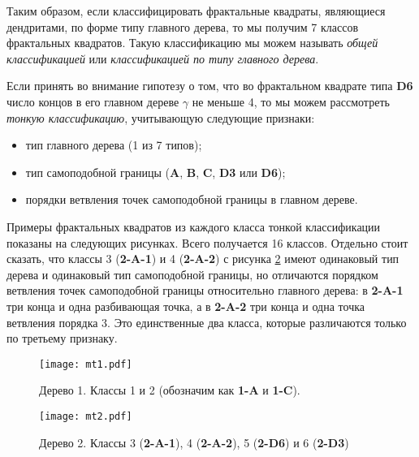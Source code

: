 Таким образом, если классифицировать фрактальные квадраты, являющиеся дендритами, по форме типу главного дерева, то мы получим 7 классов фрактальных квадратов.
Такую классификацию мы можем называть {\em общей классификацией} или {\em классификацией по типу главного дерева}.

Если принять во внимание гипотезу о том, что во фрактальном квадрате типа {\bf D6} число концов в его главном дереве $\gamma$ не меньше 4, то мы можем рассмотреть {\em тонкую классификацию}, учитывающую следующие признаки:
\begin{itemize}[nolistsep]
	\item[1.] тип главного дерева (1 из 7 типов);
	\item[2.] тип самоподобной границы ({\bf A}, {\bf B}, {\bf C}, {\bf D3} или {\bf D6});
	\item[3.] порядки ветвления точек самоподобной границы в главном дереве.
\end{itemize}

Примеры фрактальных квадратов из каждого класса тонкой классификации показаны на следующих рисунках.
Всего получается 16 классов.
Отдельно стоит сказать, что классы 3 ({\bf 2-A-1}) и 4 ({\bf 2-A-2}) с рисунка \ref{fig:tree2} имеют одинаковый тип дерева и одинаковый тип самоподобной границы, но отличаются порядком ветвления точек самоподобной границы относительно главного дерева: в {\bf 2-A-1} три конца и одна разбивающая точка, а в {\bf 2-A-2} три конца и одна точка ветвления порядка 3.
Это единственные два класса, которые различаются только по третьему признаку.


\begin{figure}[H]
    \centering
    \texttt{[image: mt1.pdf]}
    \vspace{0.5cm}
    \vfill
    \hfill
    \caption{Дерево 1. Классы 1 и 2 (обозначим как \textbf{1-A} и \textbf{1-C}). }
    \label{fig:tree1}
\end{figure}

\begin{figure}[H]
    \centering
    \texttt{[image: mt2.pdf]}
    \vspace{0.5cm}\vfill
    \hfill
    \vspace{0.3cm}\vfill
    \hfill
    \caption{Дерево 2. Классы 3 ({\bf 2-A-1}), 4 ({\bf 2-A-2}), 5 ({\bf 2-D6}) и 6 ({\bf 2-D3})}
    \label{fig:tree2}
\end{figure}

